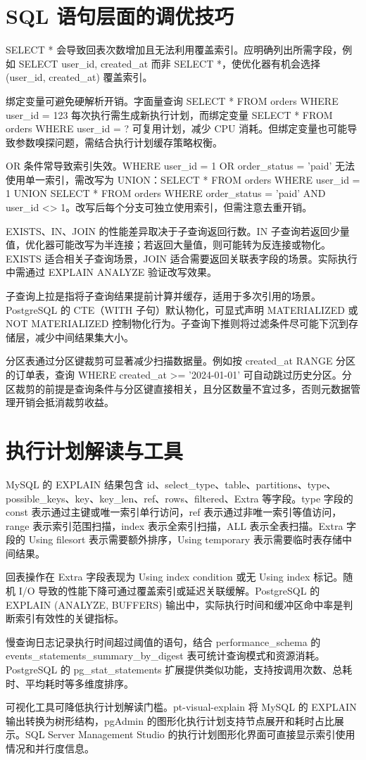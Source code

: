 \chapter{SQL 语句层面的调优技巧}
SELECT * 会导致回表次数增加且无法利用覆盖索引。应明确列出所需字段，例如 SELECT user\_{}id, created\_{}at 而非 SELECT *，使优化器有机会选择 (user\_{}id, created\_{}at) 覆盖索引。\par
绑定变量可避免硬解析开销。字面量查询 SELECT * FROM orders WHERE user\_{}id = 123 每次执行需生成新执行计划，而绑定变量 SELECT * FROM orders WHERE user\_{}id = ? 可复用计划，减少 CPU 消耗。但绑定变量也可能导致参数嗅探问题，需结合执行计划缓存策略权衡。\par
OR 条件常导致索引失效。WHERE user\_{}id = 1 OR order\_{}status = 'paid' 无法使用单一索引，需改写为 UNION：SELECT * FROM orders WHERE user\_{}id = 1 UNION SELECT * FROM orders WHERE order\_{}status = 'paid' AND user\_{}id <> 1。改写后每个分支可独立使用索引，但需注意去重开销。\par
EXISTS、IN、JOIN 的性能差异取决于子查询返回行数。IN 子查询若返回少量值，优化器可能改写为半连接；若返回大量值，则可能转为反连接或物化。EXISTS 适合相关子查询场景，JOIN 适合需要返回关联表字段的场景。实际执行中需通过 EXPLAIN ANALYZE 验证改写效果。\par
子查询上拉是指将子查询结果提前计算并缓存，适用于多次引用的场景。PostgreSQL 的 CTE（WITH 子句）默认物化，可显式声明 MATERIALIZED 或 NOT MATERIALIZED 控制物化行为。子查询下推则将过滤条件尽可能下沉到存储层，减少中间结果集大小。\par
分区表通过分区键裁剪可显著减少扫描数据量。例如按 created\_{}at RANGE 分区的订单表，查询 WHERE created\_{}at >= '2024-01-01' 可自动跳过历史分区。分区裁剪的前提是查询条件与分区键直接相关，且分区数量不宜过多，否则元数据管理开销会抵消裁剪收益。\par
\chapter{执行计划解读与工具}
MySQL 的 EXPLAIN 结果包含 id、select\_{}type、table、partitions、type、possible\_{}keys、key、key\_{}len、ref、rows、filtered、Extra 等字段。type 字段的 const 表示通过主键或唯一索引单行访问，ref 表示通过非唯一索引等值访问，range 表示索引范围扫描，index 表示全索引扫描，ALL 表示全表扫描。Extra 字段的 Using filesort 表示需要额外排序，Using temporary 表示需要临时表存储中间结果。\par
回表操作在 Extra 字段表现为 Using index condition 或无 Using index 标记。随机 I/O 导致的性能下降可通过覆盖索引或延迟关联缓解。PostgreSQL 的 EXPLAIN (ANALYZE, BUFFERS) 输出中，实际执行时间和缓冲区命中率是判断索引有效性的关键指标。\par
慢查询日志记录执行时间超过阈值的语句，结合 performance\_{}schema 的 events\_{}statements\_{}summary\_{}by\_{}digest 表可统计查询模式和资源消耗。PostgreSQL 的 pg\_{}stat\_{}statements 扩展提供类似功能，支持按调用次数、总耗时、平均耗时等多维度排序。\par
可视化工具可降低执行计划解读门槛。pt-visual-explain 将 MySQL 的 EXPLAIN 输出转换为树形结构，pgAdmin 的图形化执行计划支持节点展开和耗时占比展示。SQL Server Management Studio 的执行计划图形化界面可直接显示索引使用情况和并行度信息。\par
